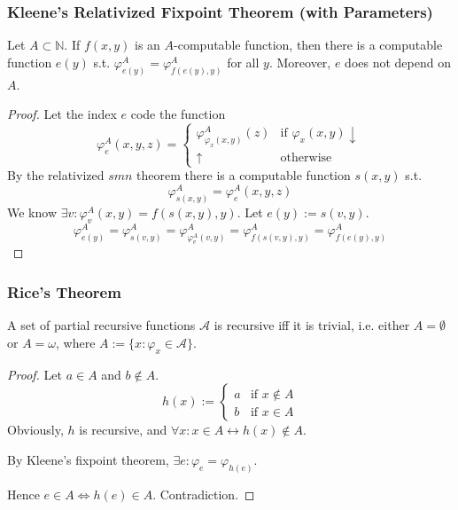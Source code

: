 \documentclass[UTF8,aspectratio=43,11pt,colorlinks,compress,openany]{beamer}%
\begin{document}
\begin{frame}\frametitle{Kleene's Relativized Fixpoint Theorem (with Parameters)}
\setlength\abovedisplayskip{0pt}
\setlength\belowdisplayskip{0pt}
\begin{theorem}
Let $A\subset\mathbb{N}$. If $f(x,y)$ is an $A$-computable function, then there is a computable function $e(y)$ s.t. $\varphi_{e(y)}^A=\varphi_{f(e(y),y)}^A$ for all $y$. Moreover, $e$ does not depend on $A$.
\end{theorem}
\begin{proof}
Let the index $e$ code the function
\[\varphi_e^A(x,y,z)=
\begin{cases}
\varphi_{\varphi_x(x,y)}^A(z) &\mbox{if } \varphi_x(x,y)\downarrow\\
\uparrow &\mbox{otherwise}
\end{cases}
\]
By the relativized $smn$ theorem there is a computable function $s(x,y)$ s.t.
\[\varphi_{s(x,y)}^A=\varphi_e^A(x,y,z)\]
We know $\exists v: \varphi_v^A(x,y)=f(s(x,y),y)$. Let $e(y):=s(v,y)$.
\[\varphi_{e(y)}^A=\varphi_{s(v,y)}^A=\varphi_{\varphi_v^A(v,y)}^A=\varphi_{f(s(v,y),y)}^A=\varphi_{f(e(y),y)}^A\]
\end{proof}
\end{frame}

\begin{frame}\frametitle{Rice's Theorem}
	\begin{theorem}
		A set of partial recursive functions $\mathcal{A}$ is recursive iff it is trivial, i.e. either $A=\emptyset$ or $A=\omega$, where $A:=\{x:\varphi_x\in\mathcal{A}\}$.
	\end{theorem}
	\begin{proof}
		Let $a\in A$ and $b\notin A$.
		\[h(x):=\begin{cases}
		a &\mbox{if } x\notin A\\
		b &\mbox{if } x\in A
		\end{cases}\]
		Obviously, $h$ is recursive, and $\forall x: x\in A\leftrightarrow h(x)\notin A$.
		
		By Kleene's fixpoint theorem, $\exists e: \varphi_e=\varphi_{h(e)}$.
		
		Hence $e\in A\iff h(e)\in A$. Contradiction.
	\end{proof}
\end{frame}
\end{document}
